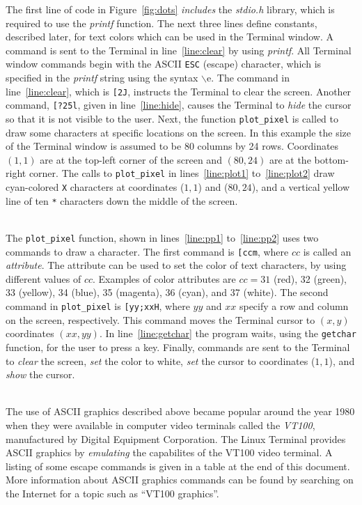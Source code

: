 \documentclass[epsfig,10pt,fullpage]{article}
\begin{document}
\noindent
The first line of code in Figure~\ref{fig:dots} {\it includes} 
the {\it stdio.h} library, which is required to use the {\it printf} function. The next three 
lines define constants, described later, for text colors which can be used in the Terminal window. 
A command is sent to the Terminal in line~\ref{line:clear} by using {\it printf}. All Terminal 
window commands begin with the ASCII \texttt{ESC} (escape) character, which is specified 
in the {\it printf} string using the syntax $\backslash$e. The command in line~\ref{line:clear},
which is \texttt{[2J}, instructs the Terminal to clear the screen. Another command, 
\texttt{[?25l}, given in line~\ref{line:hide}, causes the Terminal to {\it hide} the cursor 
so that it is not visible to the user. Next, the function \texttt{plot\_pixel} is called to draw
some characters at specific locations on the screen. In this example the size of the Terminal 
window is assumed to be 80 columns by 24 rows. Coordinates $(1, 1)$ are at the top-left corner 
of the screen and $(80, 24)$ are at the bottom-right corner. The calls to \texttt{plot\_pixel} in
lines~\ref{line:plot1} to~\ref{line:plot2} draw cyan-colored \texttt{X} characters at
coordinates ($1, 1$) and ($80, 24$), and a vertical yellow line of ten \texttt{*} characters
down the middle of the screen.

~\\
\noindent The \texttt{plot\_pixel} function, shown in lines~\ref{line:pp1} to~\ref{line:pp2} uses 
two commands to draw a character. The first command is \texttt{[ccm}, where $cc$ is
called an {\it attribute}. The attribute can be used to set the color of text characters,
by using different values of $cc$. Examples of color attributes are $cc = 31$ (red), 
32 (green), 33 (yellow), 34 (blue), 35 (magenta), 36 (cyan), and 37 (white). The second command 
in \texttt{plot\_pixel} is \texttt{[yy;xxH}, where $yy$ and $xx$ specify a row and
column on the screen, respectively. This command moves the Terminal cursor to $(x,y)$ coordinates
$(xx, yy)$. In line~\ref{line:getchar} the program waits, using the \texttt{getchar}
function, for the user to press a key. Finally, commands are sent to the Terminal to {\it clear} 
the screen, {\it set} the color to white, {\it set} the cursor to coordinates ($1, 1$), and
{\it show} the cursor.

~\\
\noindent 
The use of ASCII graphics described above became popular around the year 1980 when they
were available in computer video terminals called the {\it VT100}, manufactured by Digital 
Equipment Corporation. The Linux Terminal provides ASCII graphics by {\it emulating} the 
capabilites of the VT100 video terminal. A listing of some escape commands is given in 
a table at the end of this document. More information about ASCII graphics 
commands can be found by searching on the Internet for a topic such as ``VT100 graphics''.
\end{document}
